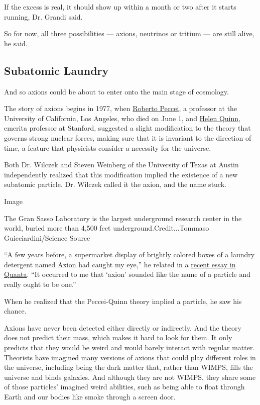 If the excess is real, it should show up within a month or two after it
starts running, Dr. Grandi said.

So for now, all three possibilities --- axions, neutrinos or tritium ---
are still alive, he said.

\hypertarget{subatomic-laundry}{%
\subsection{Subatomic Laundry}\label{subatomic-laundry}}

And so axions could be about to enter onto the main stage of cosmology.

The story of axions begins in 1977, when
\href{https://en.wikipedia.org/wiki/Roberto_Peccei}{Roberto Peccei}, a
professor at the University of California, Los Angeles, who died on June
1, and \href{https://en.wikipedia.org/wiki/Helen_Quinn}{Helen Quinn},
emerita professor at Stanford, suggested a slight modification to the
theory that governs strong nuclear forces, making sure that it is
invariant to the direction of time, a feature that physicists consider a
necessity for the universe.

Both Dr. Wilczek and Steven Weinberg of the University of Texas at
Austin independently realized that this modification implied the
existence of a new subatomic particle. Dr. Wilczek called it the axion,
and the name stuck.

Image

The Gran Sasso Laboratory is the largest underground research center in
the world, buried more than 4,500 feet underground.Credit...Tommaso
Guicciardini/Science Source

``A few years before, a supermarket display of brightly colored boxes of
a laundry detergent named Axion had caught my eye,'' he related in a
\href{https://www.quantamagazine.org/how-axions-may-explain-times-arrow-20160107/}{recent
essay in Quanta}. ``It occurred to me that `axion' sounded like the name
of a particle and really ought to be one.''

When he realized that the Peccei-Quinn theory implied a particle, he saw
his chance.

Axions have never been detected either directly or indirectly. And the
theory does not predict their mass, which makes it hard to look for
them. It only predicts that they would be weird and would barely
interact with regular matter. Theorists have imagined many versions of
axions that could play different roles in the universe, including being
the dark matter that, rather than WIMPS, fills the universe and binds
galaxies. And although they are not WIMPS, they share some of those
particles' imagined weird abilities, such as being able to float through
Earth and our bodies like smoke through a screen door.

